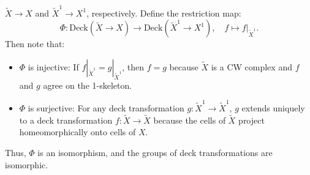 \documentclass[12pt]{article}
\begin{document}
\begin{newproof}
\begin{itemize}
      $\tilde{X} \to X$ and $\tilde{X}^1 \to X^1$, respectively. Define the restriction map:
      $$ \Phi: \text{Deck}(\tilde{X} \to X) \to \text{Deck}(\tilde{X}^1 \to X^1), \quad f \mapsto f|_{\tilde{X}^1}. $$ 
      Then note that:
      \begin{itemize}
        \item $\Phi$ is injective: If $f|_{\tilde{X}^1} = g|_{\tilde{X}^1}$, then $f = g$ because $\tilde{X}$ is a CW complex 
          and $f$ and $g$ agree on the 1-skeleton.
        \item $\Phi$ is surjective: For any deck transformation $g: \tilde{X}^1 \to \tilde{X}^1$, $g$ extends uniquely to a 
          deck transformation $f: \tilde{X} \to \tilde{X}$ because the cells of $\tilde{X}$ project 
          homeomorphically onto cells of $X$.
      \end{itemize}
      Thus, $\Phi$ is an isomorphism, and the groups of deck transformations are isomorphic.
  \end{itemize}
\end{newproof}
\end{document}
